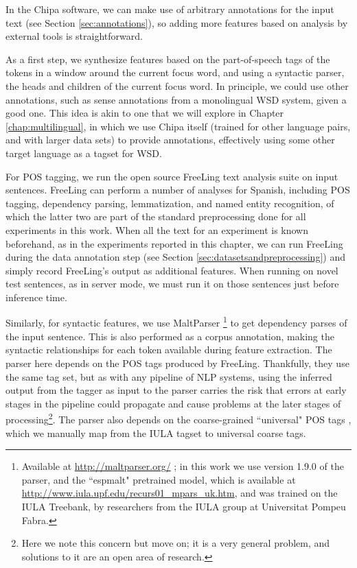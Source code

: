 In the Chipa software, we can make use of arbitrary annotations for the input
text (see Section \ref{sec:annotations}), so adding more features based on
analysis by external tools is straightforward.

As a first step, we synthesize features based on the part-of-speech tags of the
tokens in a window around the current focus word, and using a syntactic parser,
the heads and children of the current focus word. In principle, we could use
other annotations, such as sense annotations from a monolingual WSD system,
given a good one. This idea is akin to one that we will explore in Chapter
\ref{chap:multilingual}, in which we use Chipa itself (trained for other
language pairs, and with larger data sets) to provide annotations, effectively
using some other target language as a tagset for WSD.

For POS tagging, we run the open source FreeLing text analysis suite
\cite{padro12} on input sentences. FreeLing can perform a number of analyses
for Spanish, including POS tagging, dependency parsing, lemmatization, and
named entity recognition, of which the latter two are part of the standard
preprocessing done for all experiments in this work. When all the text for an
experiment is known beforehand, as in the experiments reported in this chapter,
we can run FreeLing during the data annotation step (see Section
\ref{sec:datasetsandpreprocessing}) and simply record FreeLing's output as
additional features. When running on novel test sentences, as in server mode,
we must run it on those sentences just before inference time.

Similarly, for syntactic features, we use MaltParser\cite{Nivre06maltparser:a}
\footnote{Available at \url{http://maltparser.org/} ; in this work we use
version 1.9.0 of the parser, and the ``espmalt" pretrained model, which is
available at \url{http://www.iula.upf.edu/recurs01_mpars_uk.htm}, and was
trained on the IULA Treebank\cite{MARIMON12.519}, by researchers from the IULA
group at Universitat Pompeu Fabra.} to get dependency parses of the input
sentence. This is also performed as a corpus annotation, making the syntactic
relationships for each token available during feature extraction. The parser
here depends on the POS tags produced by FreeLing. Thankfully, they use the
same tag set, but as with any pipeline of NLP systems, using the inferred
output from the tagger as input to the parser carries the risk that errors at
early stages in the pipeline could propagate and cause problems at the later
stages of processing\footnote{Here we note this concern but move on; it is a
very general problem, and solutions to it are an open area of research.}.  The
parser also depends on the coarse-grained ``universal" POS tags
\cite{PETROV12.274}, which we manually map from the IULA tagset to universal
coarse tags.

